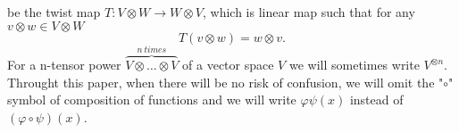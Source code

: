 \documentclass[a4paper]{article}
\begin{document}
be the twist map $T:V \otimes W \to W\otimes V$, which is linear map such that for any $v \otimes w
\in V \otimes W$
\begin{equation*}
T(v \otimes w) = w\otimes v.
\end{equation*}
For a n-tensor power $\overbrace{V \otimes \dots \otimes V}^{n\ times}$  of a vector space $V$ we will
sometimes write $V^{\otimes n}$.\\
Throught this paper, when there will be no risk
of confusion, we will omit the "$\circ$" symbol of composition of functions and we will write
$\varphi \psi (x)$ instead of $(\varphi \circ \psi)(x)$.
\end{document}
